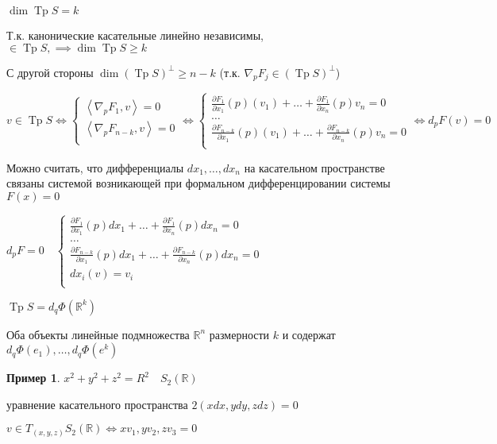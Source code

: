 \documentclass{book}
\newcommand\R{\ensuremath{\mathbb{R}}}
\theoremstyle{definition}
\newtheorem*{example}{Пример}
\DeclareMathOperator{\Tp}{Tp}
\begin{document}
  \begin{corollary}
      $\dim \Tp S = k$

      Т.к. канонические касательные линейно независимы,  $\in \Tp S, \implies \dim \Tp S \geqslant k$

      С другой стороны $\dim \left( \Tp S \right) ^{\perp} \geqslant n-k$ (т.к. $\nabla _p F_j\in \left( \Tp S \right) ^{\perp} $)
  \end{corollary}

  $v\in \Tp S \iff  \begin{cases}
      \left<\nabla _pF_1, v \right> = 0\\
      \left<\nabla _p F_{n-k}, v \right> = 0\\
  \end{cases} \iff  \begin{cases}
  \frac{\partial F_1}{\partial x_1}(p)(v_1) + \ldots + \frac{\partial F_1}{\partial x_{n} }(p)v_n = 0\\
  \ldots\\
  \frac{\partial F_{n-k}}{\partial x_1}(p)(v_1) + \ldots + \frac{\partial F_{n-k}}{\partial x_{n} }(p)v_n = 0\\
  \end{cases}\iff d_p F(v) = 0$

  Можно считать, что дифференциалы $dx_1, \ldots, dx_{n} $ на касательном пространстве связаны системой возникающей при формальном дифференцировании системы $F(x) = 0$

  $d_p F = 0\quad \begin{cases}
  \frac{\partial F_1}{\partial x_1}(p)dx_1 + \ldots + \frac{\partial F_1}{\partial x_{n} }(p)dx_{n}  = 0\\
  \ldots\\
  \frac{\partial F_{n-k}}{\partial x_1}(p)dx_1 + \ldots + \frac{\partial F_{n-k}}{\partial x_{n} }(p)dx_{n}  = 0\\
  dx_i(v) = v_i\\
  \end{cases}$

 \begin{corollary}
     $\Tp S = d_q \Phi\left( \R^k \right) $ 

     Оба объекты линейные подмножества $\R^n$ размерности $k$ и содержат  $d_q\Phi(e_1), \ldots, d_q\Phi(e^k)$
 \end{corollary}

 \begin{example}
     $x^2+y^2+z^2 = R^2\quad S_2(\R)$

     уравнение касательного пространства $2\left( xdx, ydy, zdz \right)  = 0$

     $v\in T_{(x,y,z)}S_2(\R) \iff  xv_1, yv_2, zv_3 = 0$
 \end{example}
\end{document}
